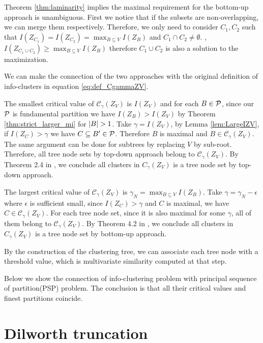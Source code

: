 \documentclass{article}
\begin{document}
Theorem \ref{thm:laminarity} implies the maximal requirement for the bottom-up approach is unambiguous. First we notice that if the subsets are non-overlapping, we can merge them respectively. Therefore, we only need to consider $C_1, C_2$ such that $I(Z_{C_1}) = I(Z_{C_2}) = \max_{B\subseteq V} I(Z_B)$ and $C_1\cap C_2 \neq \emptyset$. , $I(Z_{C_1\cup C_2}) \geq \max_{B\subseteq V} I(Z_B)$ therefore $C_1\cup C_2$ is also a solution to the maximization.

We can make the connection of the two approaches with the original definition of info-clusters in 
equation \eqref{eq:def_CgammaZV}.

The smallest critical value of $\mathcal{C}_{\gamma}(Z_V)$ is $I(Z_V)$  and for each $B \in \P$, since  our $\P$ is fundamental partition we have $I(Z_B) > I(Z_V)$ by Theorem \ref{thm:strict_larger_mi} for $\abs{B}>1$. Take $\gamma = I(Z_V)$, by Lemma \ref{lem:LargeIZV}, if $I(Z_C) > \gamma$ we have $C\subseteq B' \in \P$. Therefore $B$ is maximal and $B\in \mathcal{C}_{\gamma}(Z_V)$. The same argument can be done for subtrees by replacing $V$ by sub-root. Therefore, all tree node sets by top-down approach belong to $\mathcal{C}_{\gamma}(Z_V)$. By Theorem 2.4 in \cite{ic}, we conclude all clusters in $C_{\gamma}(Z_V)$ is a tree node set by top-down approach.

The largest critical value of $\mathcal{C}_{\gamma}(Z_V)$ is $\gamma_N = \max_{B\subseteq V} I(Z_B)$. Take $\gamma = \gamma_N - \epsilon$ where $\epsilon$ is sufficient small, since $I(Z_C) > \gamma$ and $C$ is maximal, we have $C \in \mathcal{C}_{\gamma}(Z_V)$. For each tree node set, since it is also maximal for some $\gamma$, all of them belong to $\mathcal{C}_{\gamma}(Z_V)$. By Theorem 4.2 in \cite{agg}, we conclude all clusters in $C_{\gamma}(Z_V)$ is a tree node set by bottom-up approach.

By the construction of the clustering tree, we can associate each tree node with a threshold value, which is multivariate similarity computed at that step.

Below we show the connection of info-clustering problem with principal sequence of partition(PSP) problem. The conclusion is that all their critical values 
and finest partitions coincide.

\section{Dilworth truncation}
\end{document}
